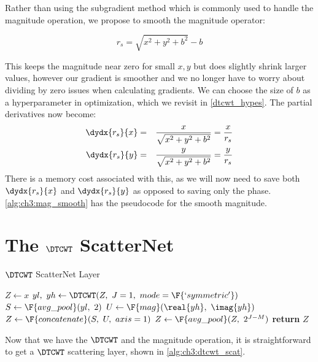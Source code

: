 Rather than using the subgradient method \cite{boyd_subgradient_2003} which is
commonly used to handle the magnitude operation, we propose to smooth the
magnitude operator:

\begin{equation}\label{eq:ch3:magbias}
 r_s = \sqrt{x^2 + y^2 + b^2} - b
\end{equation}

This keeps the magnitude near zero for small $x,y$ but does slightly shrink larger
values, however our gradient is smoother and we no
longer have to worry about dividing by zero issues when calculating gradients.
We can choose the size of $b$ as a hyperparameter in optimization, which we
revisit in \autoref{dtcwt_hypes}. The partial derivatives now become:
\begin{eqnarray}
  \dydx{r_s}{x} & = & \frac{x}{\sqrt{x^2 + y^2+b^2}} = \frac{x}{r_s}\\
  \dydx{r_s}{y} & = & \frac{y}{\sqrt{x^2 + y^2+b^2}} = \frac{y}{r_s}
\end{eqnarray}
There is a memory cost associated with this, as we will now need to save both
$\dydx{r_s}{x}$ and $\dydx{r_s}{y}$ as opposed to saving only the phase.
\autoref{alg:ch3:mag_smooth} has the pseudocode for the smooth magnitude.

\section{The $\DTCWT$ ScatterNet}\label{sec:ch3:scat}
\begin{algorithm}[tb]
  \caption{$\DTCWT$ ScatterNet Layer}
  \label{alg:ch3:dtcwt_scat}
\begin{algorithmic}[1]
\State $Z \gets x$
  \State $yl,\ yh \gets \DTCWT(Z,\ J=1,\ mode=\F{`symmetric'})$
  \State $S \gets \F{avg\_pool}(yl,\ 2)$
  \State $U \gets \F{mag}(\real{yh},\ \imag{yh})$
  \State $Z \gets \F{concatenate}(S,\ U,\ axis=1)$ 
\EndFor
{}
\State $Z \gets \F{avg\_pool}(Z,\ 2^{J-M})$
\EndIf
\State \textbf{return} $Z$
\EndFunction
\end{algorithmic}
\end{algorithm}
Now that we have the $\DTCWT$ and the magnitude operation, it is straightforward
to get a $\DTCWT$ scattering layer, shown in \autoref{alg:ch3:dtcwt_scat}.


